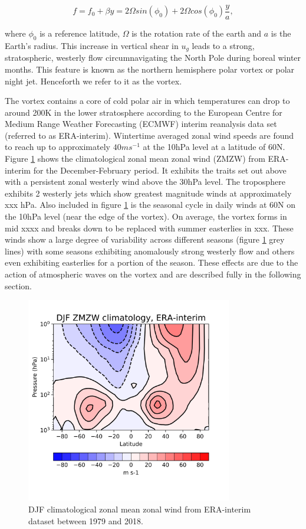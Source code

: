 \begin{equation} \label{eq:beta_plane_approx}
f = f_0 + \beta y = 2 \Omega sin(\phi_0) + 2 \Omega cos(\phi_0)\frac{ y}{a},
\end{equation}

where $\phi_0$ is a reference latitude, $\Omega$ is the rotation rate of the earth and $a$ is the Earth's radius. This increase in vertical shear in $u_g$ leads to a strong, stratospheric, westerly flow circumnavigating the North Pole during boreal winter months. This feature is known as the northern hemisphere polar vortex or polar night jet. Henceforth we refer to it as the vortex.

The vortex contains a core of cold polar air in which temperatures can drop to around 200K in the lower stratosphere according to the European Centre for Medium Range Weather Forecasting (ECMWF) interim reanalysis data set (referred to as ERA-interim). Wintertime averaged zonal wind speeds are found to reach up to approximately $40ms^{-1}$ at the 10hPa level at a latitude of 60N. Figure \ref{fig:ERAclimDJF} shows the climatological zonal mean zonal wind (ZMZW) from ERA-interim for the December-February period. It exhibits the traits set out above with a persistent zonal westerly wind above the 30hPa level. The troposphere exhibits 2 westerly jets which show greatest magnitude winds at approximately xxx hPa. Also included in figure \ref{fig:ERAclimDJF} is the seasonal cycle in daily winds at 60N on the 10hPa level (near the edge of the vortex). On average, the vortex forms in mid xxxx and breaks down to be replaced with summer easterlies in xxx. These winds show a large degree of variability across different seasons (figure \ref{fig:ERAclimDJF} grey lines) with some seasons exhibiting anomalously strong westerly flow and others even exhibiting easterlies for a portion of the season. These effects are due to the action of atmospheric waves on the vortex and are described fully in the following section. 


\begin{figure}[h!]
\centering
    \includegraphics[width= 9cm]{Figures/Figures-background/fig1_for_transfer.png}
    \caption{DJF climatological zonal mean zonal wind from ERA-interim dataset between 1979 and 2018.}
    \label{fig:ERAclimDJF}
\centering
\end{figure}

